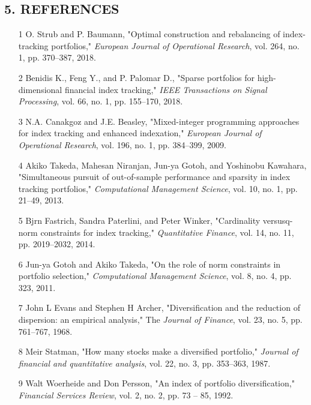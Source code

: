 \documentclass{article}
\begin{document}
\subsection{5. REFERENCES}
\begin{itemize}
\item 
[1] O. Strub and P. Baumann, "Optimal construction and rebalancing of index-tracking portfolios," \textit{European Journal of Operational Research}, vol. 264, no. 1, pp. 370–387, 2018.

\item 
[2] Benidis K., Feng Y., and P. Palomar D., "Sparse portfolios for high-dimensional financial index tracking," \textit{IEEE Transactions on Signal Processing}, vol. 66, no. 1, pp. 155–170, 2018.

\item 
[3] N.A. Canakgoz and J.E. Beasley, "Mixed-integer programming approaches for index tracking and enhanced indexation," \textit{European Journal of Operational Research}, vol. 196, no. 1, pp. 384–399, 2009.

\item 
[4] Akiko Takeda, Mahesan Niranjan, Jun-ya Gotoh, and Yoshinobu Kawahara, "Simultaneous pursuit of out-of-sample performance and sparsity in index tracking portfolios," \textit{Computational Management Science}, vol. 10, no. 1, pp. 21–49, 2013.

\item 
[5] Bjrn Fastrich, Sandra Paterlini, and Peter Winker, "Cardinality versusq-norm constraints for index tracking," \textit{Quantitative Finance}, vol. 14, no. 11, pp. 2019–2032, 2014.

\item 
[6] Jun-ya Gotoh and Akiko Takeda, "On the role of norm constraints in portfolio selection," \textit{Computational Management Science}, vol. 8, no. 4, pp. 323, 2011.

\item 
[7] John L Evans and Stephen H Archer, "Diversification and the reduction of dispersion: an empirical analysis," The \textit{Journal of Finance}, vol. 23, no. 5, pp. 761–767, 1968.

\item 
[8] Meir Statman, "How many stocks make a diversified portfolio," \textit{Journal of financial and quantitative analysis}, vol. 22, no. 3, pp. 353–363, 1987.

\item 
[9] Walt Woerheide and Don Persson, "An index of portfolio diversification," \textit{Financial Services Review}, vol. 2, no. 2, pp. 73 – 85, 1992.


\end{itemize}
\end{document}
